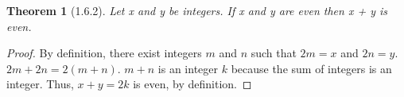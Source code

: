 \documentclass[a4paper, 12pt]{article}
\theoremstyle{plain}
\newtheorem*{theorem*}{Theorem}
\begin{document}
	
	\begin{theorem*}[1.6.2]
		Let x and y be integers. If x and y are even then x + y is even.
	\end{theorem*}
	
	\begin{proof}
		By definition, there exist integers $m$ and $n$ such that $2m = x$ and $2n = y$. $2m + 2n = 2(m + n)$. $m + n$ is an integer $k$ because the sum of integers is an integer. Thus, $x + y = 2k$ is even, by definition.
	\end{proof}
\end{document}

